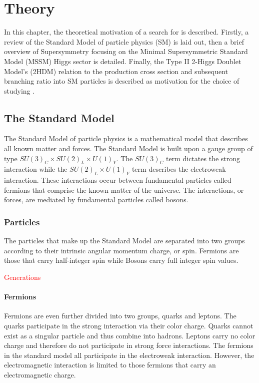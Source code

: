 \chapter{Theory}
    In this chapter, the theoretical motivation of a search for \HpLong is described. Firstly, a review of the Standard Model of particle physics (SM) is laid out, then a brief overview of Supersymmetry focusing on the Minimal Supersymmetric Standard Model (MSSM) Higgs sector is detailed. Finally, the Type II 2-Higgs Doublet Model's (2HDM) relation to the \Hp production cross section and subsequent branching ratio into SM particles is described as motivation for the choice of studying \HpLong.

\section{The Standard Model}
	The Standard Model of particle physics is a mathematical model that describes all known matter and forces. The Standard Model is built upon a gauge group of type $SU(3)_C \times SU(2)_L \times U(1)_Y$. The $SU(3)_C$ term dictates the strong interaction while the $SU(2)_L \times U(1)_Y$ term describes the electroweak interaction. These interactions occur between fundamental particles called fermions that comprise the known matter of the universe. The interactions, or forces, are mediated by fundamental particles called bosons. 

	\subsection{Particles}        
		The particles that make up the Standard Model are separated into two groups according to their intrinsic angular momentum charge, or spin. Fermions are those that carry half-integer spin while Bosons carry full integer spin values.

		\textcolor{red}{Generations}

		\subsubsection{Fermions}	
		Fermions are even further divided into two groups, quarks and leptons. The quarks participate in the strong interaction via their color charge. Quarks cannot exist as a singular particle and thus combine into hadrons. Leptons carry no color charge and therefore do not participate in strong force interactions. The fermions in the standard model all participate in the electroweak interaction. However, the electromagnetic interaction is limited to those fermions that carry an electromagnetic charge.

